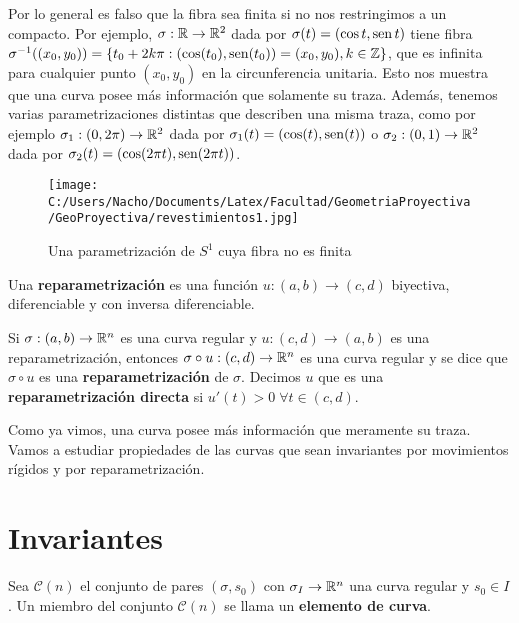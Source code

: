 \begin{ex}
Por lo general es falso que la fibra sea finita si no nos restringimos a un compacto. Por ejemplo, $\sigma:\mathbb{R}\to\mathbb{R}^2$ dada por $\sigma(t)=(\cos t,\operatorname{sen} t)$ tiene fibra $\sigma^{-1}((x_0,y_0)) = \{t_0 + 2k\pi : (\cos(t_0),\operatorname{sen}(t_0))=(x_0,y_0), k\in\mathbb{Z}\}$, que es infinita para cualquier punto $(x_0,y_0)$ en la circunferencia unitaria. Esto nos muestra que una curva posee más información que solamente su traza. Además, tenemos varias parametrizaciones distintas que describen una misma traza, como por ejemplo $\sigma_1:(0,2\pi)\to \mathbb{R}^2$ dada por $\sigma_1(t)=(\cos(t),\operatorname{sen}(t))$ o $\sigma_2:(0,1)\to \mathbb{R}^2$ dada por $\sigma_2(t)=(\cos(2\pi t),\operatorname{sen}(2\pi t))$.
\begin{figure}[h]
	\centering
		\texttt{[image: C:/Users/Nacho/Documents/Latex/Facultad/GeometriaProyectiva/GeoProyectiva/revestimientos1.jpg]}
	\caption{Una parametrización de $S^1$ cuya fibra no es finita}
	\label{fig:revestimientos1}
\end{figure}
\end{ex}

\begin{defn}
Una \textbf{reparametrización} es una función $u:(a,b)\to (c,d)$ biyectiva, diferenciable y con inversa diferenciable.
\end{defn}

\begin{defn}
Si $\sigma:(a,b)\to\mathbb{R}^n$ es una curva regular y $u:(c,d)\to (a,b)$ es una reparametrización, entonces $\sigma\circ u:(c,d)\to\mathbb{R}^n$ es una curva regular y se dice que $\sigma\circ u$ es una \textbf{reparametrización} de $\sigma$. Decimos $u$ que es una \textbf{reparametrización directa} si $u'(t)>0 \;\forall t\in (c,d)$.
\end{defn}

Como ya vimos, una curva posee más información que meramente su traza. Vamos a estudiar propiedades de las curvas que sean invariantes por movimientos rígidos y por reparametrización.

\section{Invariantes}

\begin{defn}
Sea $\mathscr{C}(n)$ el conjunto de pares $(\sigma,s_0)$ con $\sigma_I\to\mathbb{R}^n$ una curva regular y $s_0\in I$. Un miembro del conjunto $\mathscr{C}(n)$ se llama un \textbf{elemento de curva}.
\end{defn}

